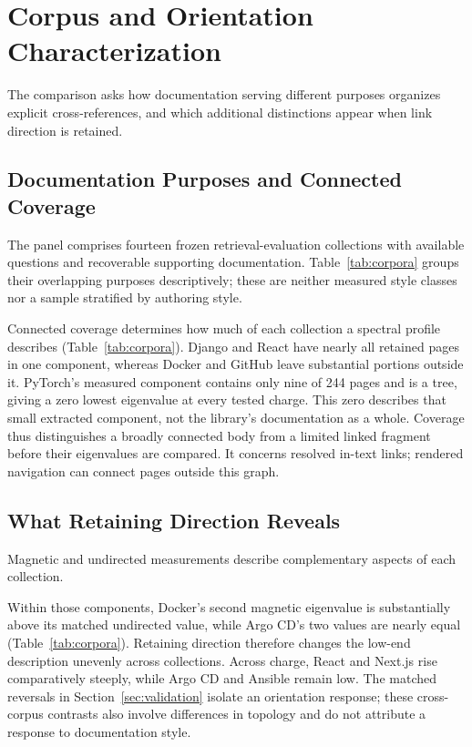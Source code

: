 \section{Corpus and Orientation Characterization}
\label{sec:corpus}
The comparison asks how documentation serving different purposes organizes
explicit cross-references, and which additional distinctions appear when link
direction is retained.


\subsection{Documentation Purposes and Connected Coverage}
The panel comprises fourteen frozen retrieval-evaluation collections with
available questions and recoverable supporting documentation.
Table~\ref{tab:corpora} groups their overlapping purposes descriptively;
these are neither measured style classes nor a sample stratified by authoring style.

Connected coverage determines how much of each collection a spectral profile
describes (Table~\ref{tab:corpora}). Django and React have nearly all retained
pages in one component, whereas Docker and GitHub leave substantial portions
outside it. PyTorch's measured component contains only nine of 244 pages and
is a tree, giving a zero lowest eigenvalue at every tested charge. This zero
describes that small extracted component, not the library's documentation as
a whole. Coverage thus distinguishes a broadly connected body from a limited
linked fragment before their eigenvalues are compared. It concerns resolved
in-text links; rendered navigation can connect pages outside this graph.

\subsection{What Retaining Direction Reveals}
Magnetic and undirected measurements describe complementary aspects of each collection.

Within those components, Docker's second magnetic eigenvalue is substantially
above its matched undirected value, while Argo CD's two values are nearly equal
(Table~\ref{tab:corpora}). Retaining direction therefore changes the low-end
description unevenly across collections. Across charge, React and Next.js rise
comparatively steeply, while Argo CD and Ansible remain low. The matched
reversals in Section~\ref{sec:validation} isolate an orientation response;
these cross-corpus contrasts also involve differences in topology and do not
attribute a response to documentation style.

